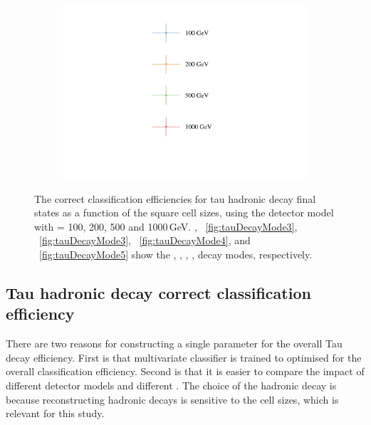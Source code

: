 \begin{figure}[htbp]
\begin{subfigure}[b]{0.45\textwidth}
  \caption{}
  \label{fig:tauDecayMode6}
\end{subfigure}
\begin{subfigure}[b]{0.45\textwidth}
  \includegraphics[width=\textwidth]{tau/plots3/legend.pdf}
  \caption{}
  \label{fig:tauDecayLegend}
\end{subfigure}
\caption[The correct classification efficiency for  tau hadronic decay final states  as a function of the \ECAL square cell sizes]
{
 The correct classification efficiencies for  tau hadronic decay final states  as a function of the \ECAL square cell sizes, using the \ILD detector model with \sqrtS = 100, 200, 500 and 1000\,GeV. , ~\ref{fig:tauDecayMode3}, ~\ref{fig:tauDecayMode3}, ~\ref{fig:tauDecayMode4},  and ~\ref{fig:tauDecayMode5} show the  \decayPionShort,  \decayRhoShortest, \decayAiPhotonShortest, \decayAiPionShortest, \decayThreePionPhotonShort decay modes, respectively.}
\label{fig:TauPionEfficiency}
\end{figure}


\subsection{Tau hadronic decay correct classification efficiency}

There are two reasons for constructing a single parameter for the overall Tau decay efficiency. First is that multivariate classifier is trained to optimised for the overall classification efficiency. Second is that it is easier to compare the impact of different detector models and different \sqrtS. The choice of the hadronic decay  is because reconstructing hadronic decays is sensitive to the \ECAL cell sizes, which is relevant for this study.

